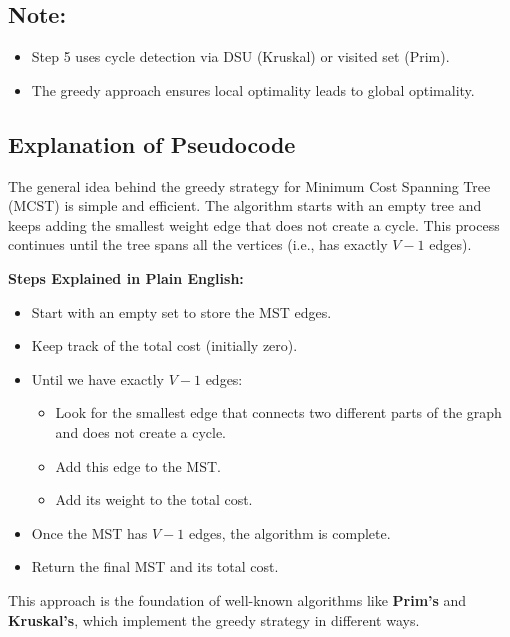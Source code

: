 \documentclass[a4paper,14pt]{extarticle}
\begin{document}
\newpage
\subsection*{Note:}
\begin{itemize}
    \item Step 5 uses cycle detection via DSU (Kruskal) or visited set (Prim).
    \item The greedy approach ensures local optimality leads to global optimality.
\end{itemize}

\subsection*{Explanation of Pseudocode}

The general idea behind the greedy strategy for Minimum Cost Spanning Tree (MCST) is simple and efficient. The algorithm starts with an empty tree and keeps adding the smallest weight edge that does not create a cycle. This process continues until the tree spans all the vertices (i.e., has exactly \(V-1\) edges).

\vspace{1em}
\textbf{Steps Explained in Plain English:}
\begin{itemize}
    \item Start with an empty set to store the MST edges.
    \item Keep track of the total cost (initially zero).
    \item Until we have exactly \(V-1\) edges:
    \begin{itemize}
        \item Look for the smallest edge that connects two different parts of the graph and does not create a cycle.
        \item Add this edge to the MST.
        \item Add its weight to the total cost.
    \end{itemize}
    \item Once the MST has \(V-1\) edges, the algorithm is complete.
    \item Return the final MST and its total cost.
\end{itemize}

\vspace{1em}
This approach is the foundation of well-known algorithms like \textbf{Prim’s} and \textbf{Kruskal’s}, which implement the greedy strategy in different ways.
\end{document}
